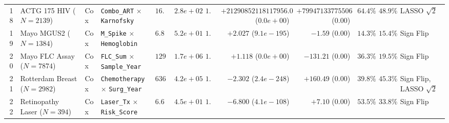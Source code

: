\begin{table}[htbp]
\begin{tabular}{rllllrrrrrrl}
18 & ACTG 175 HIV \cite{Hammer1996} ($N=2139$) & Cox & \texttt{Combo\_ART} $\times$ \texttt{Karnofsky} & $16.2$ & $2.8e+02$ & $\bm{1.00}$ & $\bm{+21290852118117956.000}$ ($0.0e+00$) & $+79947133775506304.00$ ($\bm{0.00}$) & $64.4\%$ & $\bm{48.9\%}$ & LASSO $\sqrt{2}$ \\
19 & Mayo MGUS2 \cite{Kyle2002} ($N=1384$) & Cox & \texttt{M\_Spike} $\times$ \texttt{Hemoglobin} & $6.8$ & $5.2e+01$ & $\bm{1.00}$ & $\bm{+2.027}$ ($9.1e-195$) & $-1.59$ ($\bm{0.00}$) & $14.3\%$ & $\bm{15.4\%}$ & Sign Flip \\
20 & Mayo FLC Assay \cite{Dispenzieri2012} ($N=7874$) & Cox & \texttt{FLC\_Sum} $\times$ \texttt{Sample\_Year} & $1296.4$ & $1.7e+06$ & $\bm{1.00}$ & $\bm{+1.118}$ ($0.0e+00$) & $-131.21$ ($\bm{0.00}$) & $36.3\%$ & $\bm{19.5\%}$ & Sign Flip \\
21 & Rotterdam Breast \cite{Royston2013} ($N=2982$) & Cox & \texttt{Chemotherapy} $\times$ \texttt{Surg\_Year} & $636.9$ & $4.2e+05$ & $\bm{1.00}$ & $\bm{-2.302}$ ($2.4e-248$) & $+160.49$ ($\bm{0.00}$) & $39.8\%$ & $\bm{45.3\%}$ & Sign Flip, LASSO $\sqrt{2}$ \\
22 & Retinopathy Laser \cite{DRS1976} ($N=394$) & Cox & \texttt{Laser\_Tx} $\times$ \texttt{Risk\_Score} & $6.6$ & $4.5e+01$ & $\bm{1.00}$ & $\bm{-6.800}$ ($4.1e-108$) & $+7.10$ ($\bm{0.00}$) & $53.5\%$ & $\bm{33.8\%}$ & Sign Flip \\
\bottomrule
\end{tabular}
\end{table}
